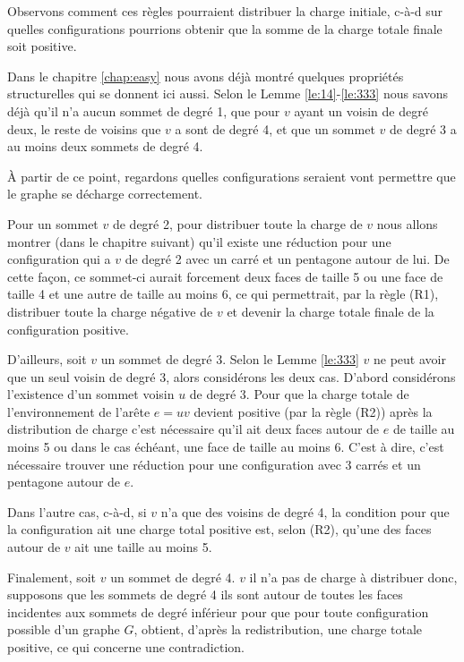 \documentclass[10pt,a4paper]{article}
\begin{document}
Observons comment ces règles pourraient distribuer la charge initiale, c-à-d sur quelles configurations pourrions obtenir que la somme de la charge totale finale soit positive.

Dans le chapitre \ref{chap:easy} nous avons déjà montré quelques propriétés structurelles qui se donnent ici aussi. Selon le Lemme \ref{le:14}-\ref{le:333} nous savons déjà qu'il n'a aucun sommet de degré 1, que pour $v$ ayant un voisin de degré deux, le reste de voisins que $v$ a sont de degré 4, et que un sommet $v$ de degré 3 a au moins deux sommets de degré 4.

À partir de ce point, regardons quelles configurations seraient vont permettre que le graphe se décharge correctement. 

Pour un sommet $v$ de degré 2, pour distribuer toute la charge de $v$ nous allons montrer (dans le chapitre suivant) qu'il existe une réduction pour une configuration qui a $v$ de degré 2 avec un carré et un pentagone autour de lui. De cette façon, ce sommet-ci aurait forcement deux faces de taille 5 ou une face de taille 4 et une autre de taille au moins 6, ce qui permettrait,  par la règle (R1), distribuer toute la charge négative de $v$ et devenir la charge totale finale de la configuration positive.

D'ailleurs, soit $v$ un sommet de degré 3. Selon le Lemme \ref{le:333} $v$ ne peut avoir que un seul voisin de degré 3, alors considérons les deux cas. D'abord considérons l'existence d'un sommet voisin $u$ de degré 3. Pour que la charge totale de l'environnement de l'arête $e=uv$ devient positive (par la règle (R2)) après la distribution de charge c'est nécessaire qu'il ait deux faces autour de $e$ de taille au moins 5 ou dans le cas échéant, une face de taille au moins 6. C'est à dire, c'est nécessaire trouver une réduction pour une configuration avec 3 carrés et un pentagone autour de $e$. 

Dans l'autre cas, c-à-d, si $v$ n'a que des voisins de degré 4, la condition pour que la configuration ait une charge total positive est, selon (R2), qu'une des faces autour de $v$ ait une taille au moins 5.

Finalement, soit $v$ un sommet de degré 4. $v$ il n'a pas de charge à distribuer donc, supposons que les sommets de degré 4 ils sont autour de toutes les faces incidentes aux sommets de degré inférieur pour que pour toute configuration possible d'un graphe $G$, obtient, d'après la redistribution, une charge totale positive, ce qui concerne une contradiction.
\end{document}
